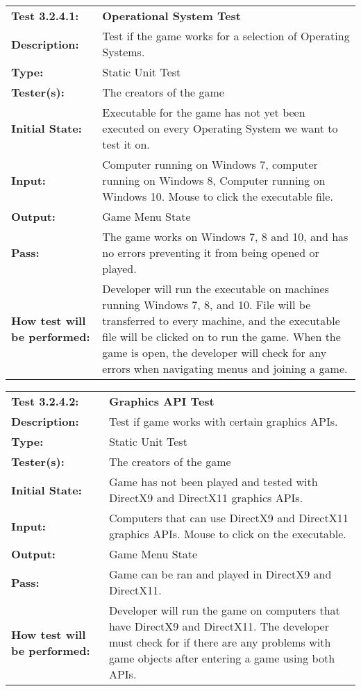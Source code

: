 \documentclass[12pt, titlepage]{article}
\begin{document}
\begin{mdframed}[linewidth=1pt]
\begin{tabularx}{\textwidth}{@{}p{3cm}X@{}}
{\bf Test 3.2.4.1:} & {\bf Operational System Test}\\[\baselineskip]
{\bf Description:} & Test if the game works for a selection of Operating Systems.\\[0.5\baselineskip]
{\bf Type:} & Static Unit Test\\[0.5\baselineskip]
{\bf Tester(s):} & The creators of the game\\[0.5\baselineskip]
{\bf Initial State:} & Executable for the game has not yet been executed on every Operating System we want to test it on.\\[0.5\baselineskip]
{\bf Input:} & Computer running on Windows 7, computer running on Windows 8, Computer running on Windows 10. Mouse to click the executable file.\\[0.5\baselineskip]
{\bf Output:} & Game Menu State\\[0.5\baselineskip]
{\bf Pass:} & The game works on Windows 7, 8 and 10, and has no errors preventing it from being opened or played.\\[0.5\baselineskip]
{\bf How test will be performed:} & Developer will run the executable on machines running Windows 7, 8, and 10. File will be transferred to every machine, and the executable file will be clicked on to run the game. When the game is open, the developer will check for any errors when navigating menus and joining a game. 
\end{tabularx}
\end{mdframed}

\begin{mdframed}[linewidth=1pt]
\begin{tabularx}{\textwidth}{@{}p{3cm}X@{}}
{\bf Test 3.2.4.2:} & {\bf Graphics API Test}\\[\baselineskip]
{\bf Description:} & Test if game works with certain graphics APIs.\\[0.5\baselineskip]
{\bf Type:} & Static Unit Test\\[0.5\baselineskip]
{\bf Tester(s):} & The creators of the game\\[0.5\baselineskip]
{\bf Initial State:} & Game has not been played and tested with DirectX9 and DirectX11 graphics APIs.\\[0.5\baselineskip]
{\bf Input:} & Computers that can use DirectX9 and DirectX11 graphics APIs. Mouse to click on the executable.\\[0.5\baselineskip]
{\bf Output:} & Game Menu State\\[0.5\baselineskip]
{\bf Pass:} & Game can be ran and played in DirectX9 and DirectX11.\\[0.5\baselineskip]
{\bf How test will be performed:} & Developer will run the game on computers that have DirectX9 and DirectX11. The developer must check for if there are any problems with game objects after entering a game using both APIs.
\end{tabularx}
\end{mdframed}
\end{document}
